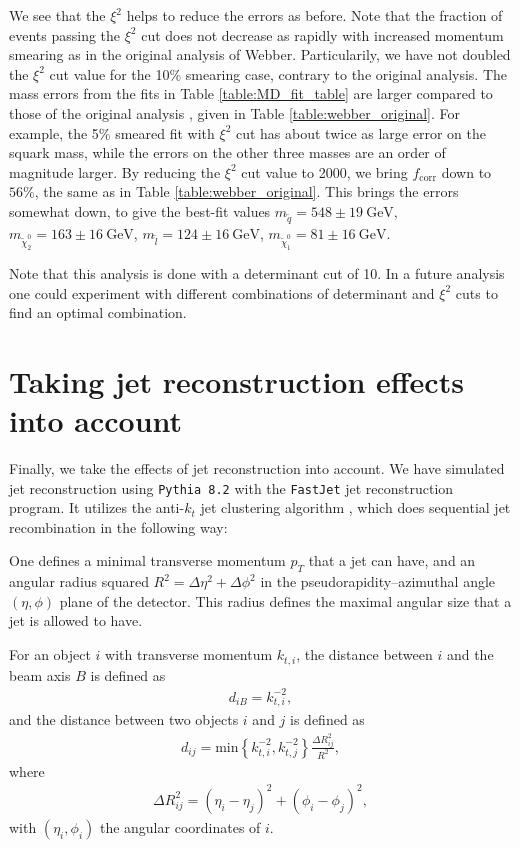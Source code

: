 \documentclass[twoside,english]{uiofysmaster}
\begin{document}
We see that the $\xi^2$ helps to reduce the errors as before. Note that the fraction of events passing the $\xi^2$ cut does not decrease as rapidly with increased momentum smearing as in the original analysis of Webber. Particularily, we have not doubled the $\xi^2$ cut value for the 10\% smearing case, contrary to the original analysis. The mass errors from the fits in Table \ref{table:MD_fit_table} are larger compared to those of the original analysis \cite{Webber:2009vm}, given in Table \ref{table:webber_original}. For example, the 5\% smeared fit with $\xi^2$ cut has about twice as large error on the squark mass, while the errors on the other three masses are an order of magnitude larger. By reducing the $\xi^2$ cut value to 2000, we bring $f_{\mathrm{corr}}$ down to $56\%$, the same as in Table \ref{table:webber_original}. This brings the errors somewhat down, to give the best-fit values $m_{\tilde q} = 548\pm19~\mathrm{GeV}$, $m_{\tilde \chi_2^0}=163\pm16~\mathrm{GeV}$, $m_{\tilde l} = 124\pm16~\mathrm{GeV}$, $m_{\tilde \chi_1^0} = 81\pm16~\mathrm{GeV}$.

Note that this analysis is done with a determinant cut of 10. In a future analysis one could experiment with different combinations of determinant and $\xi^2$ cuts to find an optimal combination.

\section{Taking jet reconstruction effects into account}
\label{sec:jetrec}
Finally, we take the effects of jet reconstruction into account. We have simulated jet reconstruction using {\tt Pythia 8.2} \cite{Sjostrand:2014zea} with the {\tt FastJet} \cite{Cacciari:2011ma} jet reconstruction program. It utilizes the anti-$k_t$ jet clustering algorithm \cite{Cacciari:2008gp}, which does sequential jet recombination in the following way:

One defines a minimal transverse momentum $p_T$ that a jet can have, and an angular radius squared $R^2 = \Delta \eta^2 + \Delta \phi^2$ in the pseudorapidity--azimuthal angle $(\eta,\phi)$ plane of the detector. This radius defines the maximal angular size that a jet is allowed to have.

For an object $i$ with transverse momentum $k_{t,i}$, the distance between $i$ and the beam axis $B$ is defined as
\begin{align}
  d_{iB} = k_{t,i}^{-2},
\end{align}
and the distance between two objects $i$ and $j$ is defined as
\begin{align}
  d_{ij} = \mathrm{min} \left\{ k_{t,i}^{-2}, k_{t,j}^{-2} \right\}\frac{\Delta R_{ij}^2}{R^2},
\end{align}
where 
\begin{align}
  \Delta R_{ij}^2 = (\eta_i - \eta_j)^2 + (\phi_i - \phi_j)^2,
\end{align}
with $(\eta_i, \phi_i)$ the angular coordinates of $i$.
\end{document}
